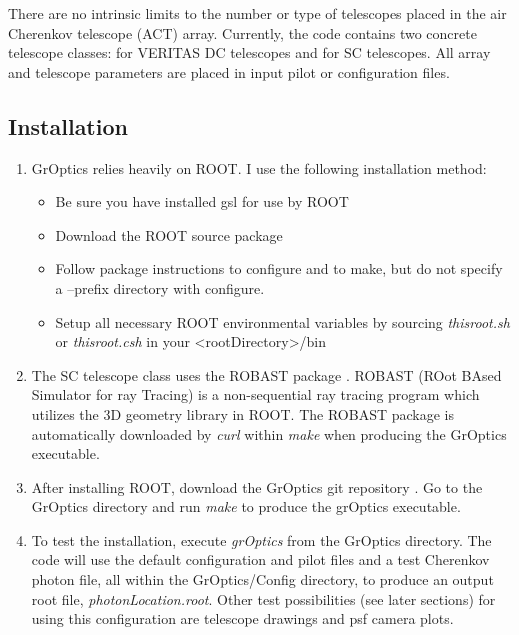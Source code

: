 \documentclass{article}
\begin{document}
There are no intrinsic limits to the number or type of telescopes placed in 
the air Cherenkov telescope (ACT) array. Currently, the code contains two 
concrete telescope 
classes: for VERITAS DC telescopes and for SC 
telescopes. All array and telescope parameters are placed in input pilot or
configuration files.   

\subsection{Installation}\label{SS:INSTALL}

\begin{enumerate}    
\item
  GrOptics relies heavily on ROOT\cite{ROOT}.  I use the following
  installation method:
  \begin{itemize} 
    \item Be sure you have installed gsl for use by ROOT
    \item Download the ROOT source package \cite{ROOT}
    \item Follow package instructions to configure and to make, but 
      do not specify a --prefix directory with configure.
    \item Setup all necessary ROOT environmental variables 
      by sourcing \emph{thisroot.sh} or \emph{thisroot.csh} in your 
      \textless rootDirectory\textgreater/bin
  \end{itemize}
  \item 
  The SC telescope class uses the ROBAST 
  package \cite{ROBAST}. 
  ROBAST (ROot BAsed Simulator for ray Tracing) is a non-sequential 
  ray tracing program which utilizes the 3D geometry library in ROOT. 
  The ROBAST package is automatically downloaded
  by \emph{curl} within \emph{make} when producing the GrOptics executable.
 
\item
  After installing
  ROOT, download the GrOptics git repository \cite{GROPTICS}.  
  Go to the GrOptics directory and run \emph{make} to produce the 
  grOptics executable.

\item
  To test the installation, 
  execute \emph{grOptics} from the GrOptics directory. The code  will use the
  default configuration and pilot files and a test Cherenkov 
  photon file, all within the GrOptics/Config directory, 
  to produce an output root file, \emph{photonLocation.root}. Other test 
  possibilities (see later sections) for using this configuration are 
  telescope drawings and psf camera plots.

\end{enumerate}
\end{document}
